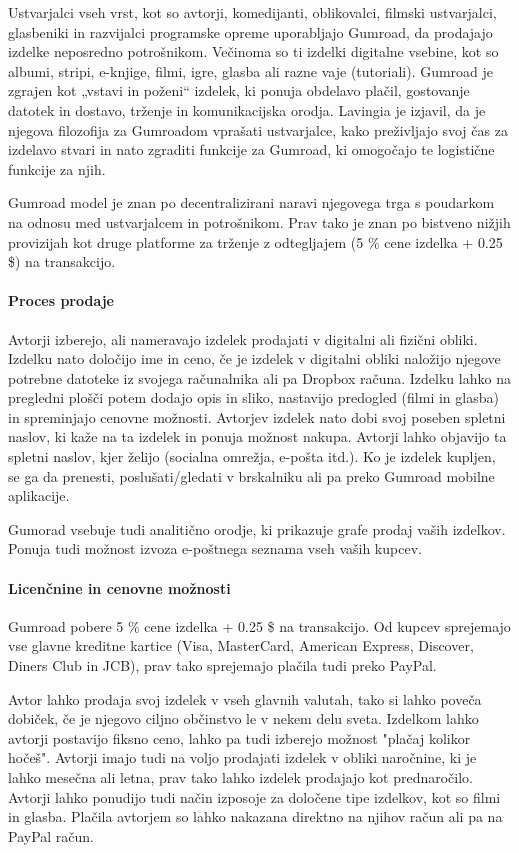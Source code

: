 \documentclass[a4paper, 12pt]{book}
\begin{document}
Ustvarjalci vseh vrst, kot so avtorji, komedijanti, oblikovalci, filmski ustvarjalci, glasbeniki in razvijalci programske opreme uporabljajo Gumroad, da prodajajo izdelke neposredno potrošnikom. Večinoma so ti izdelki digitalne vsebine, kot so albumi, stripi, e-knjige, filmi, igre, glasba ali razne vaje (tutoriali). Gumroad je zgrajen kot „vstavi in poženi“ izdelek, ki ponuja obdelavo plačil, gostovanje datotek in dostavo, trženje in komunikacijska orodja. \cite{49} Lavingia je izjavil, da je njegova filozofija za Gumroadom vprašati ustvarjalce, kako preživljajo svoj čas za izdelavo stvari in nato zgraditi funkcije za Gumroad, ki omogočajo te logistične funkcije za njih. \cite{50}

Gumroad model je znan po decentralizirani naravi njegovega trga s poudarkom na odnosu med ustvarjalcem in potrošnikom. Prav tako je znan po bistveno nižjih provizijah kot druge platforme za trženje z odtegljajem (5 \% cene izdelka + 0.25 \$) na transakcijo. \cite{51}

\paragraph{Proces prodaje}
Avtorji izberejo, ali nameravajo izdelek prodajati v digitalni ali fizični obliki. Izdelku nato določijo ime in ceno, če je izdelek v digitalni obliki naložijo njegove potrebne datoteke iz svojega računalnika ali pa Dropbox računa. Izdelku lahko na pregledni plošči potem dodajo opis in sliko, nastavijo predogled (filmi in glasba) in spreminjajo cenovne možnosti. Avtorjev izdelek nato dobi svoj poseben spletni naslov, ki kaže na ta izdelek in ponuja možnost nakupa. Avtorji lahko objavijo ta spletni naslov, kjer želijo (socialna omrežja, e-pošta itd.). Ko je izdelek kupljen, se ga da prenesti, poslušati/gledati v brskalniku ali pa preko Gumroad mobilne aplikacije.

Gumorad vsebuje tudi analitično orodje, ki prikazuje grafe prodaj vaših izdelkov. Ponuja tudi možnost izvoza e-poštnega seznama vseh vaših kupcev.


\paragraph{Licenčnine in cenovne možnosti}
Gumroad pobere 5 \% cene izdelka + 0.25 \$ na transakcijo. Od kupcev sprejemajo vse glavne kreditne kartice (Visa, MasterCard, American Express, Discover, Diners Club in JCB), prav tako sprejemajo plačila tudi preko PayPal. 

Avtor lahko prodaja svoj izdelek v vseh glavnih valutah, tako si lahko poveča dobiček, če je njegovo ciljno občinstvo le v nekem delu sveta. Izdelkom lahko avtorji postavijo fiksno ceno, lahko pa tudi izberejo možnost "plačaj kolikor hočeš". Avtorji imajo tudi na voljo prodajati izdelek v obliki naročnine, ki je lahko mesečna ali letna, prav tako lahko izdelek prodajajo kot prednaročilo. Avtorji lahko ponudijo tudi način izposoje za določene tipe izdelkov, kot so filmi in glasba. Plačila avtorjem so lahko nakazana direktno na njihov račun ali pa na PayPal račun. 
\end{document}
